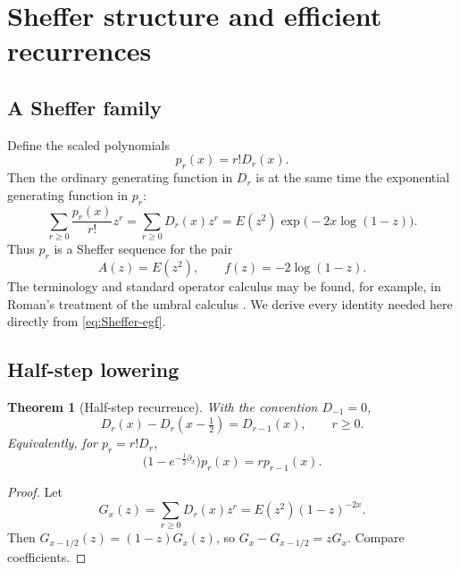 \documentclass[11pt,oneside]{article}
\numberwithin{equation}{section}
\newtheorem{theorem}{Theorem}[section]
\theoremstyle{definition}
\theoremstyle{remark}
\newcommand{\Diag}{D}
\begin{document}
\section{Sheffer structure and efficient recurrences}

\subsection{A Sheffer family}

Define the scaled polynomials
\begin{equation}
 p_r(x)=r!\Diag_r(x).
 \label{eq:p-def}
\end{equation}
Then the ordinary generating function in \(\Diag_r\) is at the same time the
exponential generating function in \(p_r\):
\begin{equation}
 \sum_{r\ge0}\frac{p_r(x)}{r!}z^r
 =\sum_{r\ge0}\Diag_r(x)z^r
 =E(z^2)\exp\!\bigl(-2x\log(1-z)\bigr).
 \label{eq:Sheffer-egf}
\end{equation}
Thus \(p_r\) is a Sheffer sequence for the pair
\begin{equation}
 A(z)=E(z^2),
 \qquad
 f(z)=-2\log(1-z).
 \label{eq:Sheffer-pair}
\end{equation}
The terminology and standard operator calculus may be found, for example, in
Roman's treatment of the umbral calculus \cite{Roman1984}.  We derive every
identity needed here directly from \eqref{eq:Sheffer-egf}.

\subsection{Half-step lowering}

\begin{theorem}[Half-step recurrence]
With the convention \(\Diag_{-1}=0\),
\begin{equation}
 \boxed{
 \Diag_r(x)-\Diag_r(x-\tfrac12)=\Diag_{r-1}(x),
 \qquad r\ge0.}
 \label{eq:half-step}
\end{equation}
Equivalently, for \(p_r=r!\Diag_r\),
\begin{equation}
 \bigl(1-e^{-\frac12\partial_x}\bigr)p_r(x)
 =r p_{r-1}(x).
 \label{eq:delta-operator}
\end{equation}
\end{theorem}

\begin{proof}
Let
\[
 G_x(z)=\sum_{r\ge0}\Diag_r(x)z^r
 =E(z^2)(1-z)^{-2x}.
\]
Then \(G_{x-1/2}(z)=(1-z)G_x(z)\), so
\(G_x-G_{x-1/2}=zG_x\).  Compare coefficients.
\end{proof}
\end{document}
